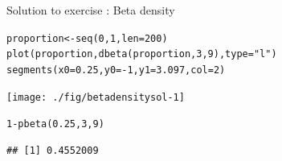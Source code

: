 \documentclass[xcolor=table,       handout,    xcolor=dvipsnames]{beamer}\usepackage[]{graphicx}\usepackage[]{color}
\makeatletter
\newcommand{\hlnum}[1]{\textcolor[rgb]{0,0,0}{#1}}
\newcommand{\hlstr}[1]{\textcolor[rgb]{0.545,0.137,0.137}{#1}}
\newcommand{\hlopt}[1]{\textcolor[rgb]{0,0,0}{#1}}
\newcommand{\hlstd}[1]{\textcolor[rgb]{0,0,0}{#1}}
\newcommand{\hlkwb}[1]{\textcolor[rgb]{0,0,0}{#1}}
\newcommand{\hlkwc}[1]{\textcolor[rgb]{1,0,1}{#1}}
\newcommand{\hlkwd}[1]{\textcolor[rgb]{0,0,1}{#1}}
\newenvironment{kframe}{%
 \def\at@end@of@kframe{}%
 \ifinner\ifhmode%
  \def\at@end@of@kframe{\end{minipage}}%
  \begin{minipage}{\columnwidth}%
 \fi\fi%
 \def\FrameCommand##1{\hskip\@totalleftmargin \hskip-\fboxsep
 \colorbox{shadecolor}{##1}\hskip-\fboxsep
     \hskip-\linewidth \hskip-\@totalleftmargin \hskip\columnwidth}%
 \MakeFramed {\advance\hsize-\width
   \@totalleftmargin\z@ \linewidth\hsize
   \@setminipage}}%
 {\par\unskip\endMakeFramed%
 \at@end@of@kframe}
\newenvironment{knitrout}{}{} %
\newcounter{exercisecount}
\makeatother
\begin{document}
\begin{frame}[fragile]{Solution to exercise : Beta density}
\vspace{-1em}
\begin{knitrout}
\color{fgcolor}\begin{kframe}
\begin{alltt}
\hlstd{proportion} \hlkwb{<-} \hlkwd{seq}\hlstd{(}\hlnum{0}\hlstd{,}\hlnum{1}\hlstd{,} \hlkwc{len}\hlstd{=}\hlnum{200}\hlstd{)}
\hlkwd{plot}\hlstd{(proportion,} \hlkwd{dbeta}\hlstd{(proportion,} \hlnum{3}\hlstd{,}\hlnum{9}\hlstd{),} \hlkwc{type}\hlstd{=}\hlstr{"l"}\hlstd{)}
\hlkwd{segments}\hlstd{(}\hlkwc{x0}\hlstd{=}\hlnum{0.25}\hlstd{,} \hlkwc{y0}\hlstd{=}\hlopt{-}\hlnum{1}\hlstd{,} \hlkwc{y1}\hlstd{=}\hlnum{3.097}\hlstd{,} \hlkwc{col}\hlstd{=}\hlnum{2}\hlstd{)}
\end{alltt}
\end{kframe}

{\centering \texttt{[image: ./fig/betadensitysol-1]} 

}



\end{knitrout}
\vspace{-1em}
\pause
\begin{knitrout}
\color{fgcolor}\begin{kframe}
\begin{alltt}
\hlnum{1}\hlopt{-}\hlkwd{pbeta}\hlstd{(}\hlnum{0.25}\hlstd{,} \hlnum{3}\hlstd{,}\hlnum{9}\hlstd{)}
\end{alltt}
\begin{verbatim}
## [1] 0.4552009
\end{verbatim}
\end{kframe}
\end{knitrout}
\end{frame}

\end{document}
